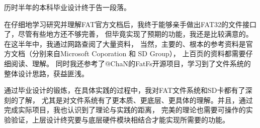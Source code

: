 \begin{grasum}
    历时半年的本科毕业设计终于告一段落。

    在仔细地学习研究并理解FAT官方文档后，我终于能够亲手做出FAT32的文件接口了，尽管有些地方还不够完善，
    但毕竟实现了预期的功能，我还是比较满意的。在这半年中，我通过网路查阅了大量资料，
    当然，主要的、根本的参考资料是官方文档（分别来自Microsoft Coporation 和 SD Group），
    上百页的资料都需要仔细阅读、理解。
    同时我还参考了@ChaN的FatFs开源项目，学习到了文件系统的整体设计思路，获益匪浅。

    通过毕业设计的锻炼，在具体实践的过程中，我对FAT文件系统和SD卡都有了深刻的了解，
    尤其是对文件系统有了更本质、更底层、更具体的理解。并且，通过完成实际项目，我也认识到了理论与实践的距离，
    完美的理论也需要可操作的实验验证，上层设计终究要与底层硬件模块相结合才能实现所需要的功能。
    
\end{grasum}
